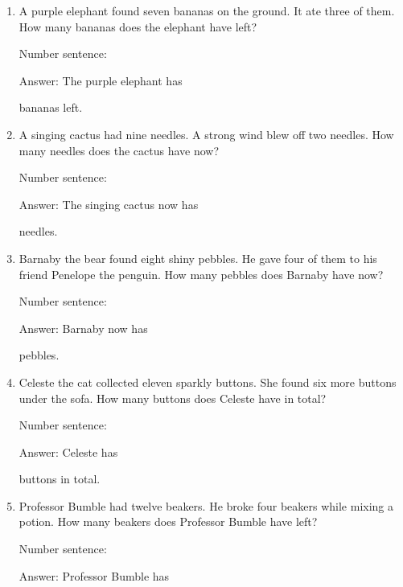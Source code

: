 \documentclass{tufte-book}
\begin{document}
\begin{enumerate}

\item
  A purple elephant found seven bananas on the ground. It ate three of
  them. How many bananas does the elephant have left?\medskip\par
  Number sentence:
  \dotfill\medskip\par
  Answer: The purple elephant has
  \dotfill\medskip\par\mbox{}\dotfill\medskip\par\mbox{}\dotfill\bigskip
  bananas left.
\item
  A singing cactus had nine needles. A strong wind blew off two needles.
  How many needles does the cactus have now?\medskip\par
  Number sentence:
  \dotfill\medskip\par
  Answer: The singing cactus now has
  \dotfill\medskip\par\mbox{}\dotfill\medskip\par\mbox{}\dotfill\bigskip
  needles.
\item
  Barnaby the bear found eight shiny pebbles. He gave four of them to
  his friend Penelope the penguin. How many pebbles does Barnaby have
  now?\medskip\par
  Number sentence:
  \dotfill\medskip\par
  Answer: Barnaby now has
  \dotfill\medskip\par\mbox{}\dotfill\medskip\par\mbox{}\dotfill\bigskip
  pebbles.
\item
  Celeste the cat collected eleven sparkly buttons. She found six more
  buttons under the sofa. How many buttons does Celeste have in total?\medskip\par
  Number sentence:
  \dotfill\medskip\par
  Answer: Celeste has
  \dotfill\medskip\par\mbox{}\dotfill\medskip\par\mbox{}\dotfill\bigskip
  buttons in total.
\item
  Professor Bumble had twelve beakers. He broke four beakers while
  mixing a potion. How many beakers does Professor Bumble have left?\medskip\par
  Number sentence:
  \dotfill\medskip\par
  Answer: Professor Bumble has
  \dotfill\medskip\par\mbox{}\dotfill\medskip\par\mbox{}\dotfill\bigskip

\end{enumerate}
\end{document}
